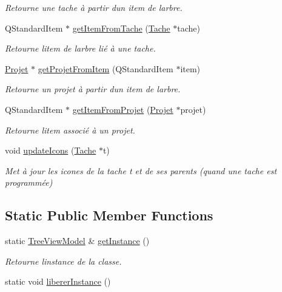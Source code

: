 \begin{DoxyCompactItemize}
\begin{DoxyCompactList}\small\item\em Retourne une tache à partir d\textquotesingle{}un item de l\textquotesingle{}arbre. \end{DoxyCompactList}\item 
Q\+Standard\+Item $\ast$ \hyperlink{class_tree_view_model_a71b5e1fb4a72adc756b6611b34a3a000}{get\+Item\+From\+Tache} (\hyperlink{class_tache}{Tache} $\ast$tache)
\begin{DoxyCompactList}\small\item\em Retourne l\textquotesingle{}item de l\textquotesingle{}arbre lié à une tache. \end{DoxyCompactList}\item 
\hyperlink{class_projet}{Projet} $\ast$ \hyperlink{class_tree_view_model_a1afea15d08be67340fff49476ddd3182}{get\+Projet\+From\+Item} (Q\+Standard\+Item $\ast$item)
\begin{DoxyCompactList}\small\item\em Retourne un projet à partir d\textquotesingle{}un item de l\textquotesingle{}arbre. \end{DoxyCompactList}\item 
Q\+Standard\+Item $\ast$ \hyperlink{class_tree_view_model_a54f066c26fef522024cd39f1eaf1c236}{get\+Item\+From\+Projet} (\hyperlink{class_projet}{Projet} $\ast$projet)
\begin{DoxyCompactList}\small\item\em Retourne l\textquotesingle{}item associé à un projet. \end{DoxyCompactList}\item 
void \hyperlink{class_tree_view_model_a9d049539995bcd46a98b58d0eb14f9b5}{update\+Icons} (\hyperlink{class_tache}{Tache} $\ast$t)
\begin{DoxyCompactList}\small\item\em Met à jour les icones de la tache t et de ses parents (quand une tache est programmée) \end{DoxyCompactList}\end{DoxyCompactItemize}
\subsection*{Static Public Member Functions}
\begin{DoxyCompactItemize}
\item 
static \hyperlink{class_tree_view_model}{Tree\+View\+Model} \& \hyperlink{class_tree_view_model_a46c11bb283dec5498dc096bde83006b7}{get\+Instance} ()
\begin{DoxyCompactList}\small\item\em Retourne l\textquotesingle{}instance de la classe. \end{DoxyCompactList}\item 
static void \hyperlink{class_tree_view_model_a263f6bd7971d922ea536fdedcbf6bb1b}{liberer\+Instance} ()
\end{DoxyCompactItemize}


